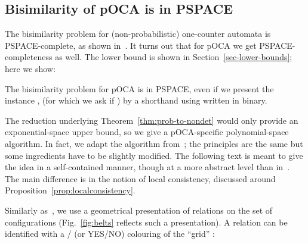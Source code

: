 \subsection{Bisimilarity
of pOCA is in PSPACE}\label{sec:bispOCAinPSPACE}

The bisimilarity problem for (non-probabilistic)
one-counter automata is  PSPACE-complete, as shown
in~\cite{BGJ:Concur10}. It turns out that for pOCA we get
PSPACE-completeness as well.
The lower bound is shown in Section~\ref{sec-lower-bounds}; here
we show:

\begin{theorem} \label{thm-bisim-pOCA-inPspace}
The bisimilarity problem for pOCA is in PSPACE, even
if we present the instance
 ,
 (for which we ask if )
by a shorthand using  written in binary.
\end{theorem}
The reduction underlying
Theorem~\ref{thm:prob-to-nondet} would only provide an
exponential-space upper bound, so
we give a pOCA-specific polynomial-space algorithm.
In fact, we adapt the algorithm from~\cite{BGJ:Concur10};
the principles are the same but some
ingredients have to be slightly modified.
The following text is meant to give the idea in a self-contained
manner, though at a more abstract
level than in~\cite{BGJ:Concur10}.
The main difference is in the notion of local consistency, discussed
around Proposition~\ref{prop:localconsistency}.

Similarly as~\cite{BGJ:Concur10},
we use a geometrical presentation of relations on
the set of configurations (Fig.~\ref{fig:belts} reflects such a
presentation).
A relation can be identified with
a / (or YES/NO)
colouring of the ``grid''  :


